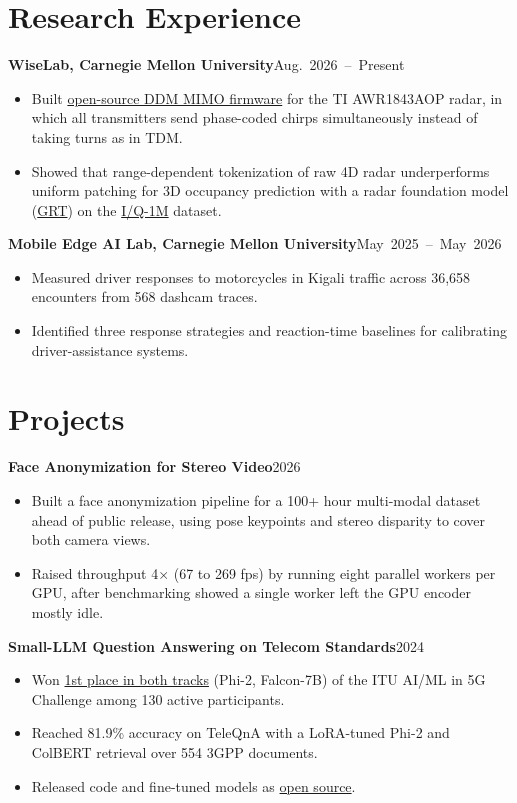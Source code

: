 \documentclass[10pt,letterpaper]{article}
\newcommand{\project}[2]{\needspace{4\baselineskip}\textbf{#1}\hfill \mbox{#2}\par}
\begin{document}
\section{Research Experience}
\project{WiseLab, Carnegie Mellon University}{Aug. 2026 -- Present}
\begin{itemize}
  \item Built \href{https://github.com/ebyau/awr1843-DDM/tree/raw-fw}{open-source DDM MIMO firmware} for the
        TI AWR1843AOP radar, in which all transmitters send phase-coded chirps simultaneously instead of
        taking turns as in TDM.
  \item Showed that range-dependent tokenization of raw 4D radar underperforms uniform patching for 3D occupancy
        prediction with a radar foundation model (\href{https://wiselabcmu.github.io/grt/}{GRT}) on the
        \href{https://radarml.github.io/red-rover/iq1m/}{I/Q-1M} dataset.
\end{itemize}
\vspace{0.6em}
\project{Mobile Edge AI Lab, Carnegie Mellon University}{May 2025 -- May 2026}
\begin{itemize}
  \item Measured driver responses to motorcycles in Kigali traffic across 36,658 encounters from 568 dashcam
        traces.
  \item Identified three response strategies and reaction-time baselines for calibrating driver-assistance
        systems.
\end{itemize}

\section{Projects}
\project{Face Anonymization for Stereo Video}{2026}
\begin{itemize}
  \item Built a face anonymization pipeline for a 100+ hour multi-modal dataset ahead of public release, using
        pose keypoints and stereo disparity to cover both camera views.
  \item Raised throughput 4$\times$ (67 to 269 fps) by running eight parallel workers per GPU, after benchmarking
        showed a single worker left the GPU encoder mostly idle.
\end{itemize}
\vspace{0.6em}
\project{Small-LLM Question Answering on Telecom Standards}{2024}
\begin{itemize}
  \item Won \href{https://zindi.world/competitions/specializing-large-language-models-for-telecom-networks/leaderboard}{1st place in both tracks}
        (Phi-2, Falcon-7B) of the ITU AI/ML in 5G Challenge among 130 active participants.
  \item Reached 81.9\% accuracy on TeleQnA with a LoRA-tuned Phi-2 and ColBERT retrieval over 554 3GPP documents.
  \item Released code and fine-tuned models as
        \href{https://github.com/Alexgichamba/itu_qna_challenge}{open source}.
\end{itemize}
\end{document}
